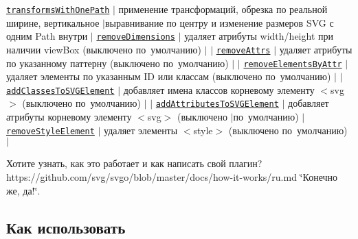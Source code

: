 \href{https://github.com/svg/svgo/blob/master/plugins/transformsWithOnePath.js}{\tt transforms\+With\+One\+Path} $\vert$ применение трансформаций, обрезка по реальной ширине, вертикальное $\vert$выравнивание по центру и изменение размеров S\+VG с одним Path внутри $\vert$ \href{https://github.com/svg/svgo/blob/master/plugins/removeDimensions.js}{\tt remove\+Dimensions} $\vert$ удаляет атрибуты width/height при наличии view\+Box (выключено по умолчанию) $\vert$ $\vert$ \href{https://github.com/svg/svgo/blob/master/plugins/removeAttrs.js}{\tt remove\+Attrs} $\vert$ удаляет атрибуты по указанному паттерну (выключено по умолчанию) $\vert$ $\vert$ \href{https://github.com/svg/svgo/blob/master/plugins/removeElementsByAttr.js}{\tt remove\+Elements\+By\+Attr} $\vert$ удаляет элементы по указанным ID или классам (выключено по умолчанию) $\vert$ $\vert$ \href{https://github.com/svg/svgo/blob/master/plugins/addClassesToSVGElement.js}{\tt add\+Classes\+To\+S\+V\+G\+Element} $\vert$ добавляет имена классов корневому элементу {\ttfamily $<$svg$>$} (выключено по умолчанию) $\vert$ $\vert$ \href{https://github.com/svg/svgo/blob/master/plugins/addAttributesToSVGElement.js}{\tt add\+Attributes\+To\+S\+V\+G\+Element} $\vert$ добавляет атрибуты корневому элементу {\ttfamily $<$svg$>$} (выключено $\vert$по умолчанию) $\vert$ \href{https://github.com/svg/svgo/blob/master/plugins/removeStyleElement.js}{\tt remove\+Style\+Element} $\vert$ удаляет элементы {\ttfamily $<$style$>$} (выключено по умолчанию) $\vert$

Хотите узнать, как это работает и как написать свой плагин? https\+://github.com/svg/svgo/blob/master/docs/how-\/it-\/works/ru.\+md \char`\"{}Конечно же, да!\char`\"{}.

\subsection*{Как использовать}






